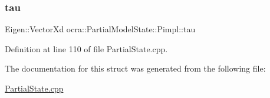 \subsubsection{\texorpdfstring{tau}{tau}}
{\footnotesize\ttfamily Eigen\+::\+Vector\+Xd ocra\+::\+Partial\+Model\+State\+::\+Pimpl\+::tau}



Definition at line 110 of file Partial\+State.\+cpp.



The documentation for this struct was generated from the following file\+:\begin{DoxyCompactItemize}
\item 
\hyperlink{PartialState_8cpp}{Partial\+State.\+cpp}\end{DoxyCompactItemize}
